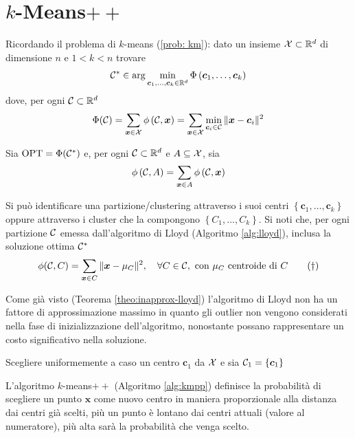 \section{$k$-Means$++$}

Ricordando il problema di $k$-means (\ref{prob: km}): dato un insieme $\mathcal{X} \subset \mathbb{R}^d$ di dimensione $n$ e $1 < k < n$ trovare
$$ \mathcal{C}^\ast \in \arg \min_{\bm c_1, \dots, \bm c_k \in \mathbb{R}^d} \Phi \left(\bm c_1, \dots, \bm c_k \right) $$
dove, per ogni $\mathcal{C} \subset \mathbb{R}^d$
$$ \Phi (\mathcal{C}) = \sum_{\bm x \in \mathcal{X}} \phi\left(\mathcal{C}, \bm x\right) = \sum_{\bm x \in \mathcal{X}} \min_{\bm c_i \in \mathcal{C}} \| \bm x - \bm c_i \|^2 $$

Sia $\textnormal{OPT} = \Phi (\mathcal{C}^\ast)$ e, per ogni $\mathcal{C} \subset \mathbb{R}^d$ e $A \subseteq \mathcal{X}$, sia
$$ \phi \left(\mathcal{C}, A\right) = \sum_{\bm x \in A} \phi \left(\mathcal{C}, \bm x \right) $$

Si può identificare una partizione/clustering attraverso i suoi centri $\left\{\bm c_1, \dots, \bm c_k\right\}$ oppure attraverso i cluster che la compongono $\left\{C_1, \dots, C_k\right\}$. Si noti che, per ogni partizione $\mathcal{C}$ emessa dall'algoritmo di Lloyd (Algoritmo \ref{alg:lloyd}), inclusa la soluzione ottima $\mathcal{C}^\ast$
\[
\phi(\mathcal{C}, C) = \sum_{\bm x \in C} \| \bm x - \mu_C \|^2, \quad \forall C \in \mathcal{C}, \text{ con } \mu_C \text{ centroide di } C \tag*{$(\dag)$}
\]

Come già visto (Teorema \ref{theo:inapprox-lloyd}) l'algoritmo di Lloyd non ha un fattore di approssimazione massimo in quanto gli outlier non vengono considerati nella fase di inizializzazione dell'algoritmo, nonostante possano rappresentare un costo significativo nella soluzione.

\begin{algorithm}
	\label{alg:kmpp}
    \caption{$k$-means$++$}
    Scegliere uniformemente a caso un centro $\bm c_1$ da $\mathcal{X}$ e sia $\mathcal{C}_1 = \left\{\bm c_1 \right\}$\;
\end{algorithm}

L'algoritmo $k$-means$++$ (Algoritmo \ref{alg:kmpp}) definisce la probabilità di scegliere un punto $\bm x$ come nuovo centro in maniera proporzionale alla distanza dai centri già scelti, più un punto è lontano dai centri attuali (valore al numeratore), più alta sarà la probabilità che venga scelto.

